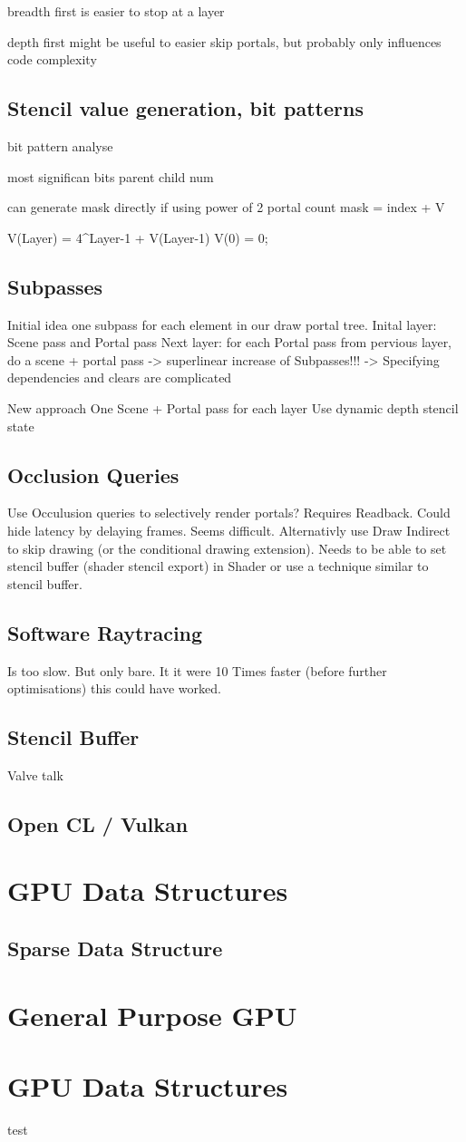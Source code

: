 breadth first is easier to stop at a layer

depth first might be useful to easier skip portals, but probably only influences code complexity

\subsection{Stencil value generation, bit patterns}
bit pattern analyse

most significan bits parent child num

can generate mask directly if using power of 2 portal count
mask = index + V

V(Layer) = 4^{Layer-1} + V(Layer-1)
V(0) = 0;

\subsection{Subpasses}
Initial idea one subpass for each element in our draw portal tree.
Inital layer: Scene pass and Portal pass
Next layer: for each Portal pass from pervious layer, do a scene + portal pass
-> superlinear increase of Subpasses!!!
-> Specifying dependencies and clears are complicated

New approach
One Scene + Portal pass for each layer
Use dynamic depth stencil state


\subsection{Occlusion Queries}
Use Occulusion queries to selectively render portals? Requires Readback. Could hide latency by delaying frames. Seems difficult.
Alternativly use Draw Indirect to skip drawing (or the conditional drawing extension). Needs to be able to set stencil buffer (shader stencil export) in Shader or use a technique similar to stencil buffer.


\subsection{Software Raytracing}
Is too slow. But only bare. It it were 10 Times faster (before further optimisations) this could have worked.


\subsection{Stencil Buffer}
Valve talk

\subsection{Open CL / Vulkan}
\section{GPU Data Structures}
\subsection{Sparse Data Structure}

\section{General Purpose GPU}

\section{GPU Data Structures}

test \cite{Heuser:2003}